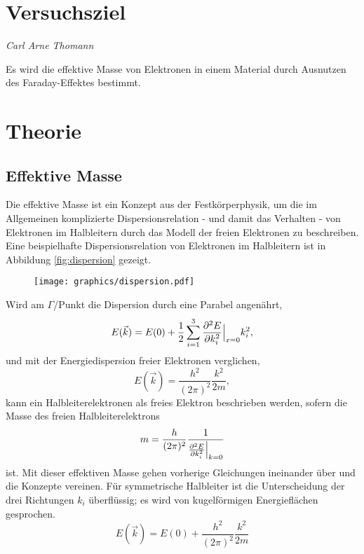 \section{Versuchsziel}
{\footnotesize \textit{Carl Arne Thomann}}

Es wird die effektive Masse von Elektronen in einem Material durch Ausnutzen des Faraday-Effektes bestimmt.
\section{Theorie}
\label{sec:Theorie}
\subsection{Effektive Masse}
Die effektive Masse ist ein Konzept aus der Festkörperphysik,
um die im Allgemeinen komplizierte Dispersionsrelation - und damit das Verhalten - von Elektronen im Halbleitern
durch das Modell der freien Elektronen zu beschreiben.
Eine beispielhafte Dispersionsrelation von Elektronen im Halbleitern ist in
Abbildung \ref{fig:dispersion} gezeigt.
\begin{figure}
    \centering
    \texttt{[image: graphics/dispersion.pdf]}
\end{figure}
Wird am $\Gamma$\-/Punkt die Dispersion durch eine Parabel angenährt,
\begin{equation}
    E(\vec k) = E(0) + \frac{1}{2}\sum\limits_{i=1}^3 \frac{\partial^2 E}{\partial k_i^2}\Bigl|_{x=0}k_i^2,
\end{equation}
und mit der Energiedispersion freier Elektronen verglichen, %
\begin{equation}
    E(\vec k) = \frac{h^2}{(2\pi)^2}\frac{k^2}{2m},
\end{equation}
kann ein Halbleiterelektronen als freies Elektron beschrieben werden, sofern die Masse des freien Halbleiterelektrons
\begin{equation}
    m = \frac{h}{(2\pi)^2}\frac{1}{\frac{\partial^2 E}{\partial k_i^2}\Bigl|_{k=0}}
\end{equation}
ist.
Mit dieser effektiven Masse gehen vorherige Gleichungen ineinander über und die Konzepte vereinen.
Für symmetrische Halbleiter ist die Unterscheidung der drei Richtungen $k_i$ überflüssig;
es wird von kugelförmigen Energieflächen gesprochen.
\begin{equation}
    E(\vec k) = E(0) + \frac{h^2}{(2\pi)^2}\frac{k^2}{2m}
\end{equation}
